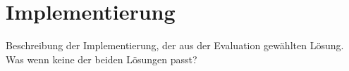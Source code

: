 \documentclass[11pt,a4paper]{report}
\begin{document}
\chapter{Implementierung} \label{chap:implementation}

Beschreibung der Implementierung, der aus der Evaluation gewählten Lösung. Was wenn keine der beiden Lösungen passt?

\end{document}
